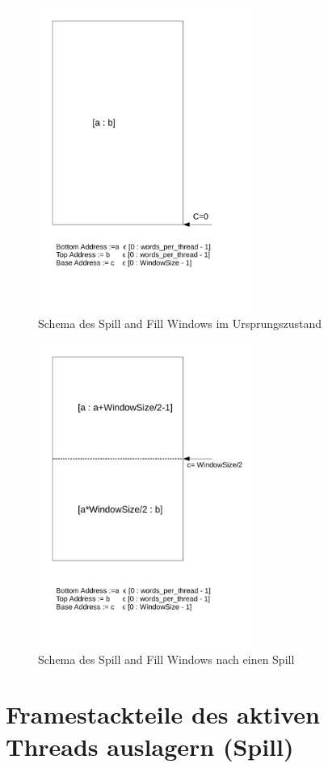 \begin{figure}[H]

	\includegraphics[height = 10cm]{PS_RS_graphics/SpillandFillWindow.pdf}
	\caption{Schema des Spill and Fill Windows im Ursprungszustand}

\end{figure}

\begin{figure}[H]
	\includegraphics[height = 10cm]{PS_RS_graphics/SpillandFillWindownacheinenSpill.pdf}
	\caption{Schema des Spill and Fill Windows nach einen Spill}

\end{figure}


\section{Framestackteile des aktiven Threads auslagern (Spill)}

